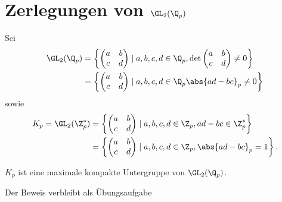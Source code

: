 \chapter{Zerlegungen von $\GL_2(\Q_p)$}
Sei
\begin{align*}
\GL_2(\Q_p)&=\left\lbrace \begin{pmatrix}
a&b\\
c&d
\end{pmatrix} \mid a,b,c,d \in \Q_p, \det \begin{pmatrix}
a&b\\
c&d
\end{pmatrix} \not =0\right\rbrace\\
&=\left\lbrace \begin{pmatrix}
a&b\\
c&d
\end{pmatrix} \mid a,b,c,d\in \Q_p \abs{ad-bc}_p \not =0\right\rbrace
\end{align*}
sowie
\begin{align*}
K_p=\GL_2(\Z_p^\ast)&=\left\lbrace \begin{pmatrix}
a&b\\
c&d
\end{pmatrix}\mid a,b,c,d \in \Z_p, ad-bc \in \Z_p^\ast\right\rbrace\\
&= \left\lbrace \begin{pmatrix}
a&b\\
c&d
\end{pmatrix} \mid a,b,c,d\in \Z_p, \abs{ad-bc}_p=1\right\rbrace.
\end{align*}

\begin{prop}
$K_p$ ist eine maximale kompakte Untergruppe von $\GL_2(\Q_p)$.
\end{prop}
Der Beweis verbleibt als Übungsaufgabe

